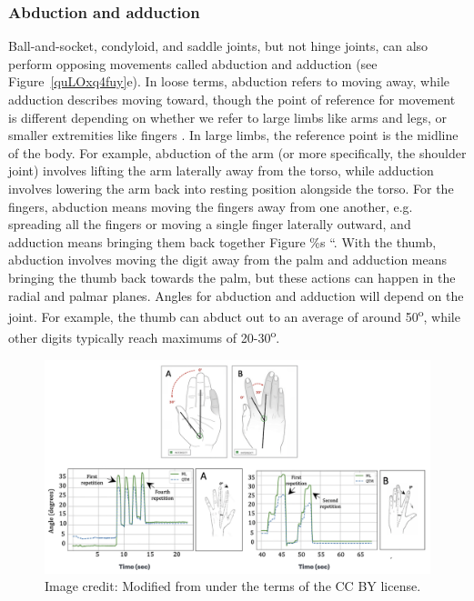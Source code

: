 \documentclass{article}
\begin{document}
\subsubsection{Abduction and adduction}

Ball-and-socket, condyloid, and saddle joints, but not hinge joints, can also perform opposing movements called abduction and adduction (see Figure~\ref{quLOxq4fuy}e). In loose terms, abduction refers to moving away, while adduction describes moving toward, though the point of reference for movement is different depending on whether we refer to large limbs like arms and legs, or smaller extremities like fingers \citep{openStax_movements}. In large limbs, the reference point is the midline of the body. For example, abduction of the arm (or more specifically, the shoulder joint) involves lifting the arm laterally away from the torso, while adduction involves lowering the arm back into resting position alongside the torso. For the fingers, abduction means moving the fingers away from one another, e.g. spreading all the fingers or moving a single finger laterally outward, and adduction means bringing them back together \citep{}Figure \%s ``. With the thumb, abduction involves moving the digit away from the palm and adduction means bringing the thumb back towards the palm, but these actions can happen in the radial and palmar planes. Angles for abduction and adduction will depend on the joint. For example, the thumb can abduct out to an average of around 50\textsuperscript{o}, while other digits typically reach maximums of 20-30\textsuperscript{o}\citep{erdogan2023evaluation}.

\begin{figure}[!htbp]
\centering
\includegraphics[width=1\linewidth]{files/EPpXta8zJdzN048lz8AR-56b271d00530c6720d8637c241e0d72b.png}
\caption[]{Image credit: Modified from \cite{Gionfrida_2022} under the terms of the CC BY license.}
\label{BVSYO3GkY2}
\end{figure}
\end{document}
